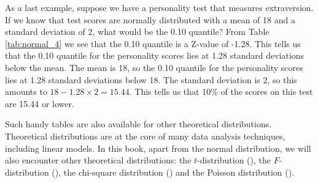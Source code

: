 \documentclass[]{book}\usepackage[]{graphicx}\usepackage[]{color}
\begin{document}
As a last example, suppose we have a personality test that measures extraversion. If we know that test scores are normally distributed with a mean of 18 and a standard deviation of 2, what would be the 0.10 quantile? From Table \ref{tab:normal_4} we see that the 0.10 quantile is a Z-value of -1.28. This tells us that the 0.10 quantile for the personality scores lies at 1.28 standard deviations below the mean. The mean is 18, so the 0.10 quantile for the personality scores lies at 1.28 standard deviations below 18. The standard deviation is 2, so this amounts to $18-1.28 \times 2= 15.44$. This tells us that 10\% of the scores on this test are 15.44 or lower.

Such handy tables are also available for other theoretical distributions. Theoretical distributions are at the core of many data analysis techniques, including linear models. In this book, apart from the normal distribution, we will also encounter other theoretical distributions: the $t$-distribution (), the $F$-distribution (), the chi-square distribution () and the Poisson distribution ().
\end{document}
